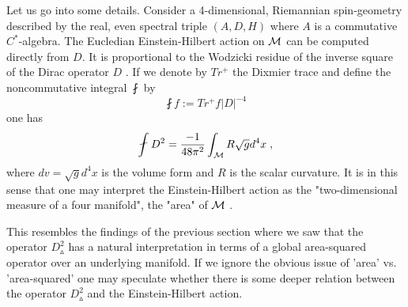 \documentclass[12pt]{article}
\newcommand{\ba}{\begin{eqnarray}}
\newcommand{\ea}{\end{eqnarray}}
\def\m{\mu}
\def\p{\pi}
\def\cm{{\cal M}}
\begin{document}
Let us go into some details. Consider a 4-dimensional, Riemannian spin-geometry described by the real, even spectral triple $(A,D,H)$ where $A$ is a commutative $C^\ast$-algebra. 
The Eucledian Einstein-Hilbert action on $\cm$ can be computed directly from $D$. It is proportional to the Wodzicki residue of the inverse square of the Dirac operator $D$ \cite{Kastler:1993zj}. If we denote by $Tr^+$ the Dixmier trace and define the noncommutative integral $\fint$ by
\[
\fint f := Tr^+ f |D|^{-4}
\]
one has
\[
\fint D^{2}=\frac{-1}{48\p^2}\int_\cm R\sqrt{g}d^4x\;,
\]
where $dv=\sqrt{g}d^4x$ is the volume form and $R$ is the scalar curvature. It is in this sense that one may interpret the Einstein-Hilbert action as the "two-dimensional measure of a four manifold", the "area" of $\cm$ \cite{Connes:2000ti}. 

This resembles the findings of the previous section where we saw that the operator $D^2_{\smalltriangleup}$ has a natural interpretation in terms of a global area-squared operator over an underlying manifold. %
If we ignore the obvious issue of 'area' vs. 'area-squared' one may speculate whether there is some deeper relation between the operator $D^2_{\smalltriangleup}$ and the Einstein-Hilbert action. 
\end{document}
